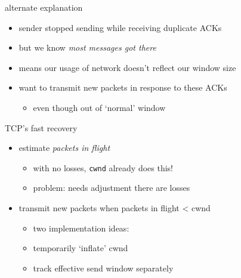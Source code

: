 \begin{frame}{alternate explanation}
    \begin{itemize}
    \item sender stopped sending while receiving duplicate ACKs
    \item but we know \textit{most messages got there}
    \item means our usage of network doesn't reflect our window size
    \vspace{.5cm}
    \item want to transmit new packets in response to these ACKs
        \begin{itemize}
        \item even though out of `normal' window
        \end{itemize}
    \end{itemize}
\end{frame}


\begin{frame}{TCP's fast recovery}
\begin{itemize}
\item estimate \textit{packets in flight}
    \begin{itemize}
    \item with no losses, \texttt{cwnd} already does this!
    \item problem: needs adjustment there are losses
    \end{itemize}
\item transmit new packets when packets in flight < cwnd
    \begin{itemize}
    \item two implementation ideas:
    \item temporarily `inflate' cwnd
    \item track effective send window separately
    \end{itemize}
\end{itemize}
\end{frame}

